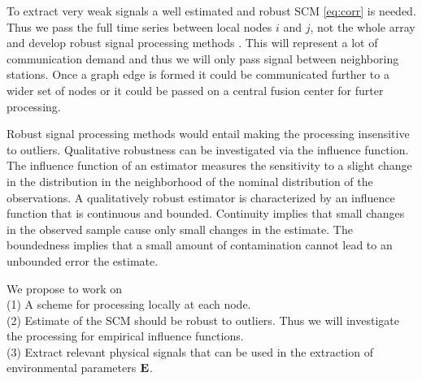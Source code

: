 To extract very weak signals  a well estimated and robust SCM \eqref{eq:corr} is needed.  Thus we  pass the full time series between local nodes $i$ and $j$, not the whole array and develop robust signal processing methods \cite{zoubir2018}. This will represent a lot of communication demand and thus we will only pass signal between neighboring stations. Once a graph edge is formed it could  be communicated further to a wider set of nodes or it could be passed on a central fusion center for furter processing. 

Robust signal processing methods \cite{zoubir2018} would entail making the processing insensitive to outliers. Qualitative robustness can be investigated via the influence function. The influence function  of an estimator 
measures the sensitivity to a slight change in the distribution
in the neighborhood of the nominal distribution of the observations. 
A qualitatively robust estimator is characterized by an influence function that is continuous and bounded. Continuity implies that small changes in the observed sample cause only small changes in the estimate. The boundedness implies that a small amount of contamination cannot lead to an unbounded error the estimate.

We propose to work on\\
(1) A scheme for processing locally at each node. \\
(2) Estimate of the SCM should be robust to outliers\cite{zoubir2018}. Thus we will investigate the processing for empirical influence functions.  %
\\
(3) Extract relevant physical signals that can be used in the extraction of environmental parameters $\bf E$.



